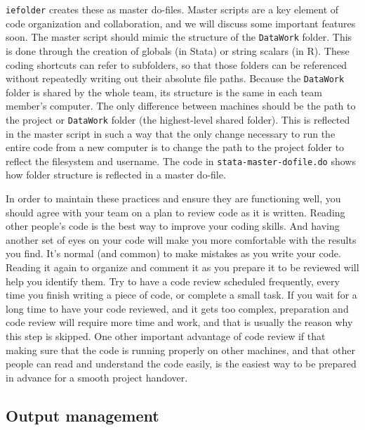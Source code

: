 \texttt{iefolder} creates these as master do-files.
Master scripts are a key element of code organization and collaboration,
and we will discuss some important features soon.
The master script should mimic the structure of the \texttt{DataWork} folder.
This is done through the creation of globals (in Stata) or string scalars (in R).
These coding shortcuts can refer to subfolders,
so that those folders can be referenced without repeatedly writing out their absolute file paths.
Because the \texttt{DataWork} folder is shared by the whole team,
its structure is the same in each team member's computer.
The only difference between machines should be
the path to the project or \texttt{DataWork} folder (the highest-level shared folder).
This is reflected in the master script in such a way that
the only change necessary to run the entire code from a new computer
is to change the path to the project folder to reflect the filesystem and username.
The code in \texttt{stata-master-dofile.do} shows how folder structure is reflected in a master do-file.

In order to maintain these practices and ensure they are functioning well,
you should agree with your team on a plan to review code as it is written.
Reading other people's code is the best way to improve your coding skills.
And having another set of eyes on your code will make you more comfortable with the results you find.
It's normal (and common) to make mistakes as you write your code.
Reading it again to organize and comment it as you prepare it to be reviewed will help you identify them.
Try to have a code review scheduled frequently,
every time you finish writing a piece of code, or complete a small task.
If you wait for a long time to have your code reviewed, and it gets too complex,
preparation and code review will require more time and work,
and that is usually the reason why this step is skipped.
One other important advantage of code review if that 
making sure that the code is running properly on other machines,
and that other people can read and understand the code easily,
is the easiest way to be prepared in advance for a smooth project handover.

\subsection{Output management}

